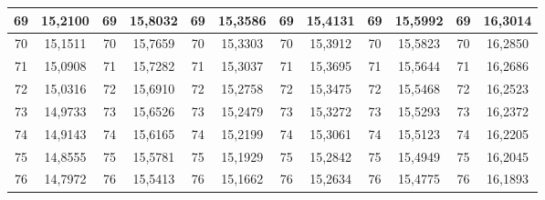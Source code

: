 \documentclass[a4paper,12pt]{article} %
\begin{document}
\begin{longtable}[c]{cccccccccc|c|c|}
	\multicolumn{1}{|c|}{69} & \multicolumn{1}{c|}{15,2100} & \multicolumn{1}{c|}{69} & \multicolumn{1}{c|}{15,8032} & \multicolumn{1}{c|}{69} & \multicolumn{1}{c|}{15,3586} & \multicolumn{1}{c|}{69} & \multicolumn{1}{c|}{15,4131} & \multicolumn{1}{c|}{69} & 15,5992 & 69 & 16,3014 \\ \hline
	\multicolumn{1}{|c|}{70} & \multicolumn{1}{c|}{15,1511} & \multicolumn{1}{c|}{70} & \multicolumn{1}{c|}{15,7659} & \multicolumn{1}{c|}{70} & \multicolumn{1}{c|}{15,3303} & \multicolumn{1}{c|}{70} & \multicolumn{1}{c|}{15,3912} & \multicolumn{1}{c|}{70} & 15,5823 & 70 & 16,2850 \\ \hline
	\multicolumn{1}{|c|}{71} & \multicolumn{1}{c|}{15,0908} & \multicolumn{1}{c|}{71} & \multicolumn{1}{c|}{15,7282} & \multicolumn{1}{c|}{71} & \multicolumn{1}{c|}{15,3037} & \multicolumn{1}{c|}{71} & \multicolumn{1}{c|}{15,3695} & \multicolumn{1}{c|}{71} & 15,5644 & 71 & 16,2686 \\ \hline
	\multicolumn{1}{|c|}{72} & \multicolumn{1}{c|}{15,0316} & \multicolumn{1}{c|}{72} & \multicolumn{1}{c|}{15,6910} & \multicolumn{1}{c|}{72} & \multicolumn{1}{c|}{15,2758} & \multicolumn{1}{c|}{72} & \multicolumn{1}{c|}{15,3475} & \multicolumn{1}{c|}{72} & 15,5468 & 72 & 16,2523 \\ \hline
	\multicolumn{1}{|c|}{73} & \multicolumn{1}{c|}{14,9733} & \multicolumn{1}{c|}{73} & \multicolumn{1}{c|}{15,6526} & \multicolumn{1}{c|}{73} & \multicolumn{1}{c|}{15,2479} & \multicolumn{1}{c|}{73} & \multicolumn{1}{c|}{15,3272} & \multicolumn{1}{c|}{73} & 15,5293 & 73 & 16,2372 \\ \hline
	\multicolumn{1}{|c|}{74} & \multicolumn{1}{c|}{14,9143} & \multicolumn{1}{c|}{74} & \multicolumn{1}{c|}{15,6165} & \multicolumn{1}{c|}{74} & \multicolumn{1}{c|}{15,2199} & \multicolumn{1}{c|}{74} & \multicolumn{1}{c|}{15,3061} & \multicolumn{1}{c|}{74} & 15,5123 & 74 & 16,2205 \\ \hline
	\multicolumn{1}{|c|}{75} & \multicolumn{1}{c|}{14,8555} & \multicolumn{1}{c|}{75} & \multicolumn{1}{c|}{15,5781} & \multicolumn{1}{c|}{75} & \multicolumn{1}{c|}{15,1929} & \multicolumn{1}{c|}{75} & \multicolumn{1}{c|}{15,2842} & \multicolumn{1}{c|}{75} & 15,4949 & 75 & 16,2045 \\ \hline
	\multicolumn{1}{|c|}{76} & \multicolumn{1}{c|}{14,7972} & \multicolumn{1}{c|}{76} & \multicolumn{1}{c|}{15,5413} & \multicolumn{1}{c|}{76} & \multicolumn{1}{c|}{15,1662} & \multicolumn{1}{c|}{76} & \multicolumn{1}{c|}{15,2634} & \multicolumn{1}{c|}{76} & 15,4775 & 76 & 16,1893 \\ \hline

\end{longtable}
\end{document}
